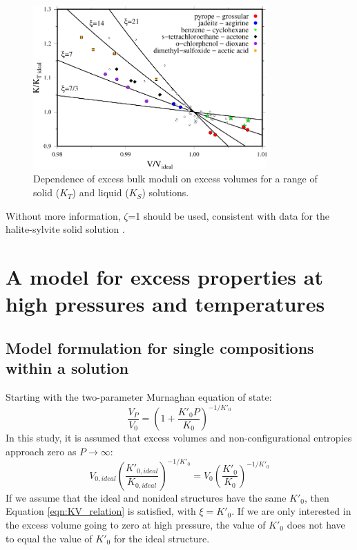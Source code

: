 \begin{figure}[ht!]
  \centering
  \includegraphics[width=0.8\textwidth]{figures/VK_ratio}
  \caption{Dependence of excess bulk moduli on excess volumes for a range of solid ($K_T$) and liquid ($K_S$) solutions.}
  \label{fig:ksi}
\end{figure}

Without more information, $\zeta$=1 should be used, consistent with data for the halite-sylvite solid solution \citep{WVCJCB2004, WVCCJB2005}.


\section{A model for excess properties at high pressures and temperatures}
\subsection{Model formulation for single compositions within a solution}
Starting with the two-parameter Murnaghan equation of state:
\begin{equation}
  \frac{V_P}{V_0} = \left( 1 + \frac{K'_0P}{K_0} \right)^{-1/K'_0}
\end{equation}
In this study, it is assumed that excess volumes and non-configurational entropies approach zero as $P \rightarrow \infty$:
\begin{equation}
V_{0, ideal} \left( \frac{K'_{0, ideal}}{K_{0, ideal}} \right)^{-1/K'_0} = V_{0} \left( \frac{K'_{0}}{K_{0}} \right)^{-1/K'_0}
\end{equation}
If we assume that the ideal and nonideal structures have the same $K'_0$, then Equation \ref{eqn:KV_relation} is satisfied, with $\xi=K'_0$. If we are only interested in the excess volume going to zero at high pressure, the value of $K'_0$ does not have to equal the value of $K'_0$ for the ideal structure.


